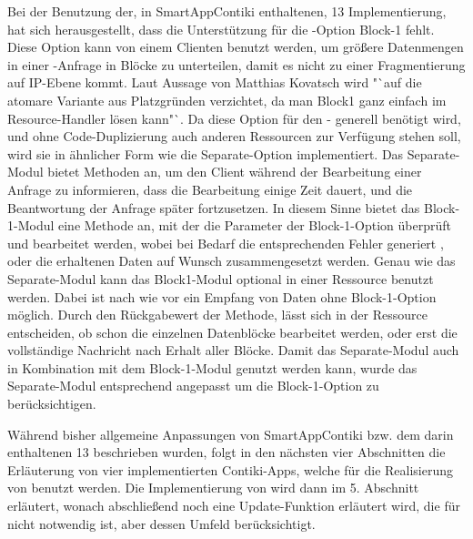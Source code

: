 Bei der Benutzung der, in SmartAppContiki enthaltenen,  13 Implementierung, hat sich herausgestellt, dass die Unterstützung für die -Option
Block-1 fehlt. Diese Option kann von einem Clienten benutzt werden, um größere Datenmengen in einer -Anfrage in Blöcke zu unterteilen, damit es nicht
zu einer Fragmentierung auf IP-Ebene kommt. Laut Aussage von Matthias Kovatsch wird "`auf die atomare Variante aus Platzgründen verzichtet, da man Block1 ganz
einfach im Resource-Handler lösen kann"`. Da diese Option für den - generell benötigt wird, und ohne Code-Duplizierung auch anderen Ressourcen
zur Verfügung stehen soll, wird sie in ähnlicher Form wie die Separate-Option implementiert. Das Separate-Modul bietet Methoden an, um den Client während der
Bearbeitung einer Anfrage zu informieren, dass die Bearbeitung einige Zeit dauert, und die Beantwortung der Anfrage später fortzusetzen. In diesem Sinne bietet
das Block-1-Modul eine Methode an, mit der die Parameter der Block-1-Option überprüft und bearbeitet werden, wobei bei Bedarf die entsprechenden Fehler generiert
, oder die erhaltenen Daten auf Wunsch zusammengesetzt werden. Genau wie das Separate-Modul kann das Block1-Modul optional in einer Ressource benutzt werden.
Dabei ist nach wie vor ein Empfang von Daten ohne Block-1-Option möglich. Durch den Rückgabewert der Methode, lässt sich in der Ressource entscheiden, ob schon
die einzelnen Datenblöcke bearbeitet werden, oder erst die vollständige Nachricht nach Erhalt aller Blöcke. Damit das Separate-Modul auch in Kombination mit dem
Block-1-Modul genutzt werden kann, wurde das Separate-Modul entsprechend angepasst um die Block-1-Option zu berücksichtigen.

Während bisher allgemeine Anpassungen von SmartAppContiki bzw. dem darin enthaltenen  13 beschrieben wurden, folgt in den nächsten vier Abschnitten
die Erläuterung von vier implementierten Contiki-Apps, welche für die Realisierung von  benutzt werden. Die Implementierung von  wird dann
im 5. Abschnitt erläutert, wonach abschließend noch eine Update-Funktion erläutert wird, die für  nicht notwendig ist, aber dessen Umfeld berücksichtigt.






